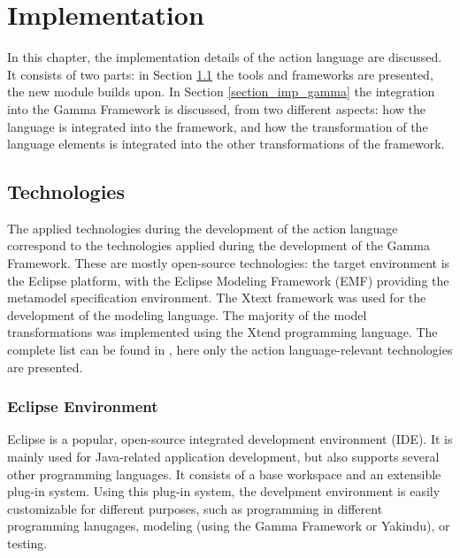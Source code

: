 \chapter{Implementation} \label{chapter_implementation}
In this chapter, the implementation details of the action language are discussed. It consists of two parts: in Section \ref{section_imp_tech} the tools and frameworks are presented, the new module builds upon. In Section \ref{section_imp_gamma} the integration into the Gamma Framework is discussed, from two different aspects: how the language is integrated into the framework, and how the transformation of the language elements is integrated into the other transformations of the framework. 

\section{Technologies} \label{section_imp_tech}
The applied technologies during the development of the action language correspond to the technologies applied during the development of the Gamma Framework. These are mostly open-source technologies: the target environment is the Eclipse platform, with the Eclipse Modeling Framework (EMF) providing the metamodel specification environment. The Xtext framework was used for the development of the modeling language. The majority of the model transformations was implemented using the Xtend programming language. The complete list can be found in \cite{BenceDipterv}, here only the action language-relevant technologies are presented. 
\subsection{Eclipse Environment}
Eclipse is a popular, open-source integrated development environment (IDE). It is mainly used for Java-related application development, but also supports several other programming languages. It consists of a base workspace and an extensible plug-in system. Using this plug-in system, the develpment environment is easily customizable for different purposes, such as programming in different programming lanugages, modeling (using the Gamma Framework or Yakindu), or testing.

